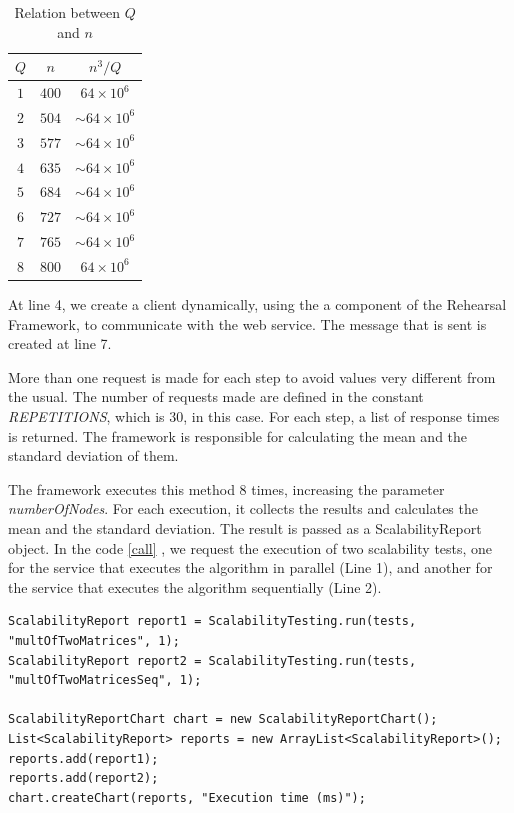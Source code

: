 \begin{table}[htdp]
\caption{Relation between $Q$ and $n$}
\begin{center}
\begin{tabular}{|c|c|c|}
\hline
$Q$ 	& $n$ 	& $n^3/Q$ \\ \hline
$1$	& $400$	& $64 \times 10^6$ \\ \hline
$2$	& $504$	& $\sim64 \times 10^6$ \\ \hline
$3$	& $577$	& $\sim64 \times 10^6$ \\ \hline
$4$	& $635$	& $\sim64 \times 10^6$ \\ \hline
$5$	& $684$	& $\sim64 \times 10^6$ \\ \hline
$6$	& $727$	& $\sim64 \times 10^6$ \\ \hline
$7$	& $765$	& $\sim64 \times 10^6$ \\ \hline
$8$	& $800$	& $64 \times 10^6$ \\ \hline

\end{tabular}
\end{center}
\label{table1}
\end{table}%

At line 4, we create a client dynamically, using the a component of the Rehearsal Framework, to communicate with the web service. The message that is sent is created at line 7. 

More than one request is made for each step to avoid values very different from the usual. The number of requests made are defined in the constant \emph{REPETITIONS}, which is 30, in this case. For each step, a list of response times is returned. The framework is responsible for calculating the mean and the standard deviation of them.

The framework executes this method 8 times, increasing the parameter \emph{numberOfNodes}. For each execution, it collects the results and calculates the mean and the standard deviation. The result is passed as a ScalabilityReport object. In the code \ref{call} , we request the execution of two scalability tests, one for the service that executes the algorithm in parallel (Line 1), and another for the service that executes the algorithm sequentially (Line 2).

\begin{lstlisting}
ScalabilityReport report1 = ScalabilityTesting.run(tests, "multOfTwoMatrices", 1);
ScalabilityReport report2 = ScalabilityTesting.run(tests, "multOfTwoMatricesSeq", 1);

ScalabilityReportChart chart = new ScalabilityReportChart();
List<ScalabilityReport> reports = new ArrayList<ScalabilityReport>();
reports.add(report1);
reports.add(report2);
chart.createChart(reports, "Execution time (ms)");
\end{lstlisting} 

